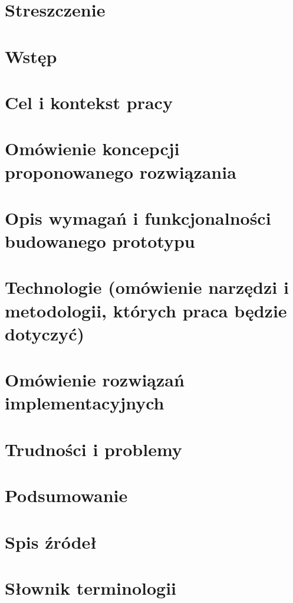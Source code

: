 \documentclass[masters]{report}
\begin{document}
\chapter{Streszczenie}
\chapter{Wstęp}
\chapter{Cel i kontekst pracy}
\chapter{Omówienie koncepcji proponowanego rozwiązania}
\chapter{Opis wymagań i funkcjonalności budowanego prototypu}
\chapter{Technologie (omówienie narzędzi i metodologii, których praca będzie dotyczyć)}
\chapter{Omówienie rozwiązań implementacyjnych}
\chapter{Trudności i problemy}
\chapter{Podsumowanie}
\chapter{Spis źródeł}
\chapter{Słownik terminologii}
\end{document}
